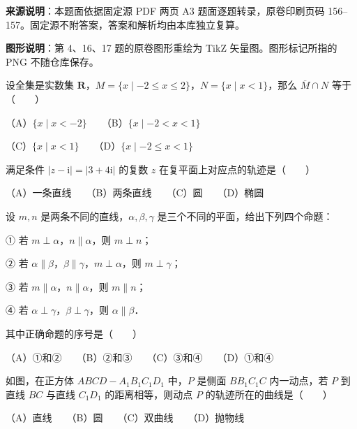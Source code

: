 

\begin{gktip}
\textbf{来源说明}：本题面依据固定源 PDF 两页 A3 题面逐题转录，原卷印刷页码 156–157。固定源不附答案，答案和解析均由本库独立复算。

\textbf{图形说明}：第 4、16、17 题的原卷图形重绘为 TikZ 矢量图。图形标记所指的 PNG 不随仓库保存。
\end{gktip}


\begin{question}
设全集是实数集 $\mathbf{R}$，$M=\{x\mid -2\le x\le 2\}$，$N=\{x\mid x<1\}$，那么 $\overline{M}\cap N$ 等于\mbox{（　　）}

（A）$\{x\mid x<-2\}$　　（B）$\{x\mid -2<x<1\}$

（C）$\{x\mid x<1\}$　　（D）$\{x\mid -2\le x<1\}$

\end{question}
\begin{question}
满足条件 $|z-\mathrm{i}|=|3+4\mathrm{i}|$ 的复数 $z$ 在复平面上对应点的轨迹是\mbox{（　　）}

（A）一条直线　　（B）两条直线　　（C）圆　　（D）椭圆

\end{question}
\begin{question}
设 $m, n$ 是两条不同的直线，$\alpha, \beta, \gamma$ 是三个不同的平面，给出下列四个命题：

① 若 $m\perp\alpha$，$n\parallel\alpha$，则 $m\perp n$；

② 若 $\alpha\parallel\beta$，$\beta\parallel\gamma$，$m\perp\alpha$，则 $m\perp\gamma$；

③ 若 $m\parallel\alpha$，$n\parallel\alpha$，则 $m\parallel n$；

④ 若 $\alpha\perp\gamma$，$\beta\perp\gamma$，则 $\alpha\parallel\beta$．

其中正确命题的序号是\mbox{（　　）}

（A）①和②　　（B）②和③　　（C）③和④　　（D）①和④

\Needspace{0.4\textheight}
\end{question}
\begin{question}
如图，在正方体 $ABCD-A_1B_1C_1D_1$ 中，$P$ 是侧面 $BB_1C_1C$ 内一动点，若 $P$ 到直线 $BC$ 与直线 $C_1D_1$ 的距离相等，则动点 $P$ 的轨迹所在的曲线是\mbox{（　　）}
\nopagebreak[4]
\begin{center}\end{center}
\nopagebreak[4]
（A）直线　　（B）圆　　（C）双曲线　　（D）抛物线

\end{question}
